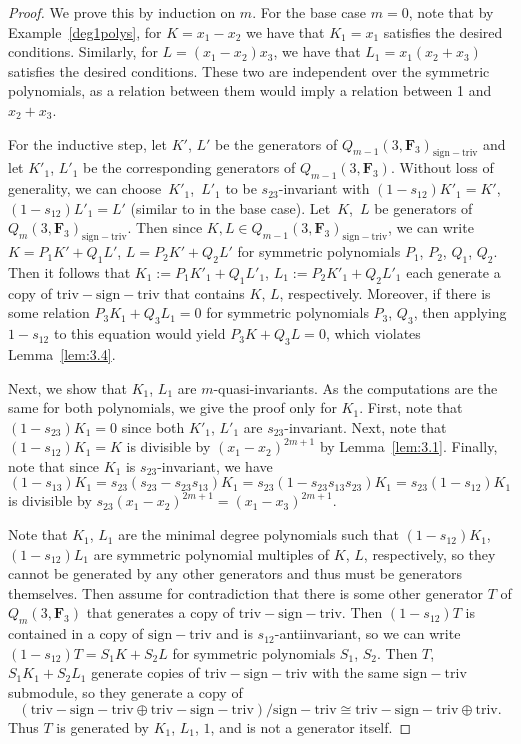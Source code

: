 \documentclass[11pt]{article}
\numberwithin{equation}{section}
\theoremstyle{definition}
\numberwithin{equation}{section}
\newcommand{\triv}{\mathrm{triv}}
\newcommand{\trix}{\mathrm{triv-sign-triv}}
\newcommand{\siv}{\mathrm{sign-triv}}
\begin{document}
 \begin{proof}
 We prove this by induction on $m$. For the base case $m=0$, note that by Example~\ref{deg1polys}, for ${K=x_1-x_2}$ we have that $K_1=x_1$ satisfies the desired conditions. Similarly, for $L=(x_1-x_2)x_3$, we have that $L_1=x_1(x_2+x_3)$ satisfies the desired conditions. These two are independent over the symmetric polynomials, as a relation between them would imply a relation between 1 and~${x_2+x_3}$.

 For the inductive step, let $K'$, $L'$ be the generators of $Q_{m-1}(3,\mathbf{F}_3)_\siv$ and let $K'_1$, $L'_1$ be the corresponding generators of $Q_{m-1}(3,\mathbf{F}_3)$. Without loss of generality, we can choose~$K'_1$,~$L'_1$ to be $s_{23}$-invariant with $(1-s_{12})K'_1=K'$, $(1-s_{12})L'_1=L'$ (similar to in the base case). Let~$K$,~$L$ be generators of $Q_m(3,\mathbf{F}_3)_\siv$. Then since $K,L\in Q_{m-1}(3,\mathbf{F}_3)_\siv$, we can write $K=P_1K'+Q_1L'$, $L=P_2K'+Q_2L'$ for symmetric polynomials $P_1$, $P_2$, $Q_1$, $Q_2$. Then it follows that $K_1:=P_1K'_1+Q_1L'_1$, $L_1:=P_2K'_1+Q_2L'_1$ each generate a copy of $\trix$ that contains $K$, $L$, respectively. Moreover, if there is some relation $P_3K_1+Q_3L_1=0$ for symmetric polynomials $P_3$, $Q_3$, then applying $1-s_{12}$ to this equation would yield $P_3K+Q_3L=0$, which violates Lemma~\ref{lem:3.4}.

 Next, we show that $K_1$, $L_1$ are $m$-quasi-invariants. As the computations are the same for both polynomials, we give the proof only for $K_1$. First, note that $(1-s_{23})K_1=0$ since both $K'_1$, $L'_1$ are $s_{23}$-invariant. Next, note that $(1-s_{12})K_1=K$ is divisible by $(x_1-x_2)^{2m+1}$ by Lemma~\ref{lem:3.1}. Finally, note that since $K_1$ is $s_{23}$-invariant, we have
 \[(1-s_{13})K_1=s_{23}(s_{23}-s_{23}s_{13})K_1=s_{23}(1-s_{23}s_{13}s_{23})K_1=s_{23}(1-s_{12})K_1\]
 is divisible by $s_{23}(x_1-x_2)^{2m+1}=(x_1-x_3)^{2m+1}$.

 Note that $K_1$, $L_1$ are the minimal degree polynomials such that $(1-s_{12})K_1$, $(1-s_{12})L_1$ are symmetric polynomial multiples of $K$, $L$, respectively, so they cannot be generated by any other generators and thus must be generators themselves. Then assume for contradiction that there is some other generator $T$ of $Q_m(3,\mathbf{F}_3)$ that generates a copy of $\trix$. Then $(1-s_{12})T$ is contained in a copy of $\siv$ and is $s_{12}$-antiinvariant, so we can write $(1-s_{12})T=S_1K+S_2L$ for symmetric polynomials $S_1$, $S_2$. Then $T$,
 $S_1K_1+S_2L_1$ generate copies of $\trix$ with the same $\siv$ submodule, so they generate a copy of
 \[(\trix\oplus\trix)/\siv\cong\trix\oplus\triv. \]
 Thus $T$ is generated by $K_1$, $L_1$, $1$, and is not a generator itself.
 \end{proof}
\end{document}
